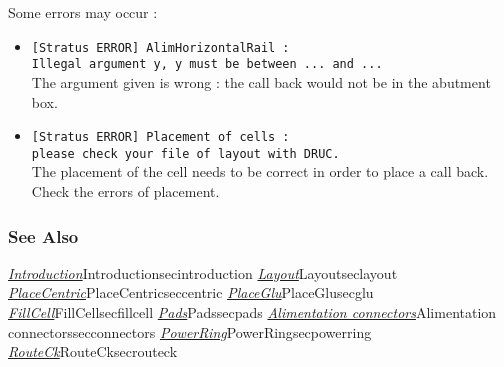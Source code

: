 Some errors may occur :
\begin{itemize}
    \item \verb-[Stratus ERROR] AlimHorizontalRail :-\\\verb-Illegal argument y, y must be between ... and ...-\\The argument given is wrong : the call back would not be in the abutment box.
    \item \verb-[Stratus ERROR] Placement of cells :-\\\verb-please check your file of layout with DRUC.-\\The placement of the cell needs to be correct in order to place a call back. Check the errors of placement.
\end{itemize} 

\subsubsection{See Also}

\hyperref[ref]{\emph{Introduction}}{}{Introduction}{secintroduction}
\hyperref[ref]{\emph{Layout}}{}{Layout}{seclayout}
\hyperref[ref]{\emph{PlaceCentric}}{}{PlaceCentric}{seccentric}
\hyperref[ref]{\emph{PlaceGlu}}{}{PlaceGlu}{secglu}
\hyperref[ref]{\emph{FillCell}}{}{FillCell}{secfillcell}
\hyperref[ref]{\emph{Pads}}{}{Pads}{secpads}
\hyperref[ref]{\emph{Alimentation connectors}}{}{Alimentation connectors}{secconnectors}
\hyperref[ref]{\emph{PowerRing}}{}{PowerRing}{secpowerring}
\hyperref[ref]{\emph{RouteCk}}{}{RouteCk}{secrouteck}
